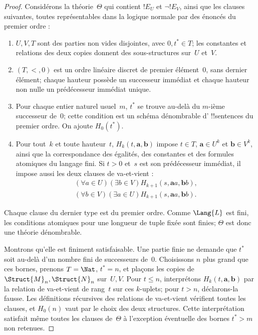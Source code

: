 \documentclass[../../../include/open-logic-section]{subfiles}
\begin{document}
\begin{proof}
Considérons la théorie~$\Theta$
qui contient $!E_U$ et
$\lnot !E_V$, ainsi que les
clauses suivantes, toutes
représentables dans la logique
normale par des énoncés du
premier ordre :
\begin{enumerate}
\item $U,V,T$ sont des parties non vides
  disjointes, avec $0,t^*\in T$; les constantes et
  relations des deux copies
  donnent des sous-structures
  sur~$U$ et~$V$.
\item $(T,<,0)$ est un ordre
  linéaire discret de premier
  élément~$0$, sans dernier
  élément; chaque hauteur possède
  un successeur immédiat et
  chaque hauteur non nulle un
  prédécesseur immédiat unique.
\item Pour chaque entier naturel
  usuel~$m$, $t^*$ se trouve
  au-delà du $m$-ième successeur
  de~$0$; cette condition est
  un schéma dénombrable d'%
  !!{sentence}s du premier ordre.
  On ajoute $H_0(t^*)$.
\item Pour tout~$k$ et toute
  hauteur~$t$, $H_k(t,\mathbf a,
  \mathbf b)$ impose $t\in T$, $\mathbf a\in U^k$ et $\mathbf b\in V^k$, ainsi que la
  correspondance des égalités,
  des constantes et des formules
  atomiques du langage fini.
  Si $t>0$ et~$s$ est son
  prédécesseur immédiat, il
  impose aussi les deux clauses
  de va-et-vient :
  \begin{align*}
  (\forall a\in U)(\exists b\in V)
    H_{k+1}(s,\mathbf a a,\mathbf b b),\\
  (\forall b\in V)(\exists a\in U)
    H_{k+1}(s,\mathbf a a,\mathbf b b).
  \end{align*}
\end{enumerate}
Chaque clause du dernier type
est du premier ordre. Comme
$\Lang{L}$ est fini, les
conditions atomiques pour une
longueur de tuple fixée sont
finies; $\Theta$ est donc
une théorie dénombrable.

Montrons qu'elle est finiment
satisfaisable. Une partie finie
ne demande que $t^*$ soit
au-delà d'un nombre fini de
successeurs de~$0$. Choisissons
$n$ plus grand que ces bornes,
prenons $T=\Nat$, $t^*=n$,
et plaçons les copies de
$\Struct{M}_n,\Struct{N}_n$
sur~$U,V$. Pour $t\leq n$,
interprétons $H_k(t,\mathbf a,
\mathbf b)$ par la relation
de va-et-vient de rang~$t$
sur ces $k$-uplets; pour
$t>n$, déclarons-la fausse.
Les définitions récursives
des relations de va-et-vient
vérifient toutes les clauses,
et $H_0(n)$ vaut par le choix
des deux structures. Cette
interprétation satisfait même
toutes les clauses de~$\Theta$
à l'exception éventuelle des
bornes $t^*>m$ non retenues.


\end{proof}
\end{document}
